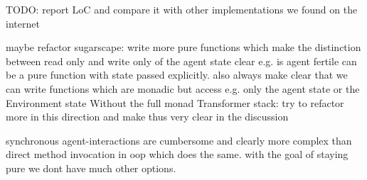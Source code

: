 TODO: report LoC and compare it with other implementations we found on the internet

maybe refactor sugarscape: write more pure functions which make the distinction between read only and write only of the agent state clear e.g. is agent fertile can be a pure function with state passed explicitly. also always make clear that we can write functions which are monadic but access e.g. only the agent state or the Environment state Without the full monad Transformer stack: try to refactor more in this direction and make thus very clear in the discussion

synchronous agent-interactions are cumbersome and clearly more complex than direct method invocation in oop which does the same. with the goal of staying pure we dont have much other options.


